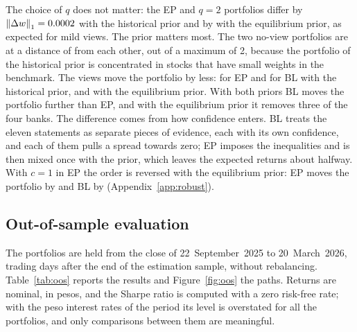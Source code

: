 \documentclass[11pt]{article}
\newcommand{\norm}[1]{\left\lVert #1 \right\rVert}
\begin{document}
\begin{table}[t]
\centering
\footnotesize
\caption{Portfolio weights (\%) at 22~September~2025, by prior and updating
rule. Simple returns, long-only, 30\% cap, $\delta = 2.5$, $\tau = 0.05$,
global confidence $0.5$ for EP. ``No views'' is the mean--variance
portfolio of each prior; for the equilibrium prior it is the benchmark. The
last row is the $\ell_1$ distance to the no-view portfolio of the same
prior.}
\label{tab:weights}

\end{table}

The choice of $q$ does not matter:
the EP and $q=2$ portfolios differ by $\norm{\Delta w}_1 = \nLoneQhist$
with the historical prior and by \nLoneQeq{} with the equilibrium prior,
as expected for mild views. The prior matters most. The two no-view
portfolios are at a distance of \nLonePrior{} from each other, out of a
maximum of 2, because the portfolio of the historical prior is concentrated
in stocks that have small weights in the benchmark. The views move the
portfolio by less: \nLoneEPhist{} for EP and \nLoneBLhist{} for BL with the
historical prior, \nLoneEPeq{} and \nLoneBLeq{} with the equilibrium
prior. With both priors BL moves the portfolio further than EP, and with the
equilibrium prior it removes three of the four banks. The difference comes
from how confidence enters. BL treats the eleven statements as separate
pieces of evidence, each with its own confidence, and each of them pulls a
spread towards zero; EP imposes the inequalities and is then mixed once
with the prior, which leaves the expected returns about halfway. With
$c=1$ in EP the order is reversed with the equilibrium prior: EP moves the
portfolio by \nLoneEPeqFull{} and BL by \nLoneBLeq{}
(Appendix~\ref{app:robust}).

\subsection{Out-of-sample evaluation}

The portfolios are held from the close of 22~September~2025 to
20~March~2026, \nDays{} trading days after the end of the estimation
sample, without rebalancing. Table~\ref{tab:oos} reports the results and
Figure~\ref{fig:oos} the paths. Returns are nominal, in pesos, and the
Sharpe ratio is computed with a zero risk-free rate; with the peso interest
rates of the period its level is overstated for all the portfolios, and
only comparisons between them are meaningful.
\end{document}
